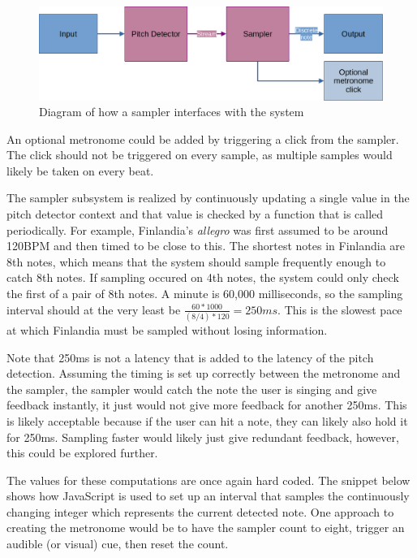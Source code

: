 \begin{figure}[ht]
    \centering
    \includegraphics[width=\textwidth]{./images/samplerArch.png}
    \caption{Diagram of how a sampler interfaces with the system\label{fig:samplerArch}}
\end{figure}

An optional metronome could be added by triggering a click from the sampler. The click should not be triggered on every sample, as multiple samples would likely be taken on every beat. 

The sampler subsystem is realized by continuously updating a single value in the pitch detector context and that value is checked by a function that is called periodically. For example, Finlandia's \textit{allegro} was first assumed to be around 120BPM and then timed to be close to this. The shortest notes in Finlandia are 8th notes, which means that the system should sample frequently enough to catch 8th notes. If sampling occured on 4th notes, the system could only check the first of a pair of 8th notes. A minute is 60,000 milliseconds, so the sampling interval should at the very least be $\frac{60*1000}{(8/4)*120} = 250ms$. This is the slowest pace at which Finlandia must be sampled without losing information.

Note that 250ms is not a latency that is added to the latency of the pitch detection. Assuming the timing is set up correctly between the metronome and the sampler, the sampler would catch the note the user is singing and give feedback instantly, it just would not give more feedback for another 250ms. This is likely acceptable because if the user can hit a note, they can likely also hold it for 250ms. Sampling faster would likely just give redundant feedback, however, this could be explored further. 

The values for these computations are once again hard coded. The snippet below shows how JavaScript is used to set up an interval that samples the continuously changing integer which represents the current detected note.  One approach to creating the metronome would be to have the sampler count to eight, trigger an audible (or visual) cue, then reset the count.




